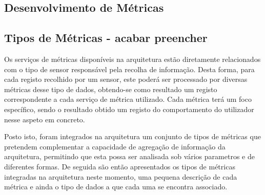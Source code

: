 \subsection{Desenvolvimento de Métricas}

\subsection{Tipos de Métricas - acabar preencher}

Os serviços de métricas disponíveis na arquitetura estão diretamente relacionados com o tipo de sensor responsável pela recolha de informação. Desta forma, para cada registo recolhido por um sensor, este poderá ser processado por diversas métricas desse tipo de dados, obtendo-se como resultado um registo correspondente a cada serviço de métrica utilizado. Cada métrica terá um foco específico, sendo o resultado obtido um registo do comportamento do utilizador nesse aspeto em concreto.

Posto isto, foram integrados na arquitetura um conjunto de tipos de métricas que pretendem  complementar a capacidade de agregação de informação da arquitetura, permitindo que esta possa ser analisada sob vários parametros e de diferentes formas. De seguida são então apresentados os tipos de métricas integradas na arquitetura neste momento, uma pequena descrição de cada métrica e ainda o tipo de dados a que cada uma se encontra associado.

